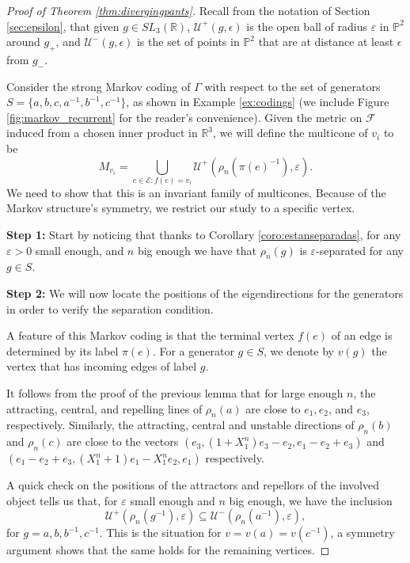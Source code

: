 \documentclass{amsart}
\newcommand{\RR}{\mathbb{R}}
\newcommand{\PP}{\mathbb{P}}
\theoremstyle{remark}
\theoremstyle{definition}
\begin{document}
\begin{proof}[Proof of Theorem \ref{thm:divergingpants}]

 Recall from the notation of Section \ref{sec:epsilon}, that given $g \in SL_3(\RR)$, $\mathcal{U}^+(g, \epsilon)$ is the open ball of radius $\varepsilon$ in $\PP^2$ around $g_+$, and $\mathcal{U}^-(g, \epsilon)$ is the set of points in $\PP^2$ that are at distance at least $\epsilon$ from $g_-$.

 Consider the strong Markov coding of $\Gamma$ with respect to the set of generators $S = \{ a, b, c, a^{-1}, b^{-1}, c^{-1} \}$, as shown in Example \ref{ex:codings} (we include Figure \ref{fig:markov_recurrent} for the reader's convenience). 
 Given the metric on $\mathcal{F}$ induced from a chosen inner product in $\mathbb{R}^3$, we will define the multicone of $v_i$ to be
 $$M_{v_i} = \bigcup_{e \in \mathcal{E}: f(e) = {v_i}}\mathcal{U}^+(\rho_n (\pi(e)^{-1}), \varepsilon).$$
We need to show that this is an invariant family of multicones. Because of the Markov structure's symmetry, we restrict our study to a specific vertex.

\textbf{Step 1:} Start by noticing that thanks to Corollary \ref{coro:estanseparadas}, for any $\varepsilon > 0$ small enough, and $n$ big enough we have that $\rho_n(g)$ is $\varepsilon$-separated for any $g \in S$.

\textbf{Step 2:} We will now locate the positions of the eigendirections for the generators in order to verify the separation condition. 

A feature of this Markov coding is that the terminal vertex $f(e)$ of an edge is determined by its label $\pi (e)$.
For a generator $g \in S$, we denote by $v(g)$ the vertex that has incoming edges of label $g$.

 It follows from the proof of the previous lemma that for large enough $n$, the attracting, central, and repelling lines of $\rho_n (a)$ are close to $e_1, e_2$, and $e_3$, respectively.
 Similarly, the attracting, central and unstable directions of $\rho_n(b)$ and $\rho_n (c)$ are close to the vectors $(e_3, (1 + X_1^n)e_3 - e_2, e_1-e_2 + e_3)$ and $(e_1 - e_2+e_3, (X_1^n+1)e_1 - X_1^n e_2, e_1)$ respectively.

 A quick check on the positions of the attractors and repellors of the involved object tells us that, for $\varepsilon$ small enough and $n$ big enough, we have the inclusion 
 $$\mathcal{U}^+(\rho_n(g^{-1}), \varepsilon) \subseteq \mathcal{U}^-(\rho_n(a^{-1}),\varepsilon),$$
 for $g = a, b, b^{-1}, c^{-1}$. 
 This is the situation for $v = v(a) = v(c^{-1})$, a symmetry argument shows that the same holds for the remaining vertices.


\end{proof}
\end{document}
